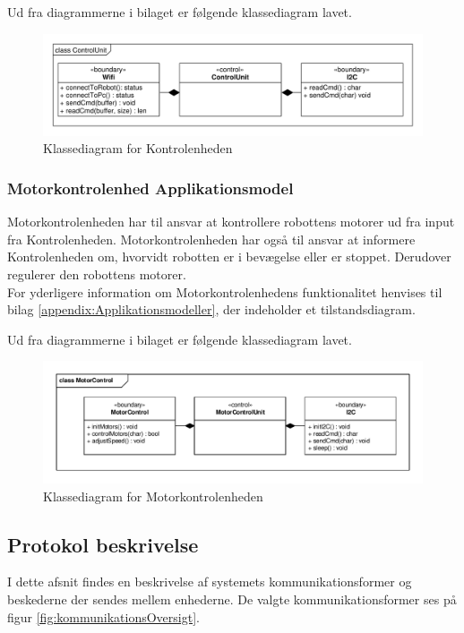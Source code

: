 Ud fra diagrammerne i bilaget er følgende klassediagram lavet.

\begin{figure}[H]
	\centering
	\includegraphics[width = \textwidth]{figur/classCUUdfyldt.pdf}
	\caption{Klassediagram for Kontrolenheden}
	\label{fig:klassediagramCU}
\end{figure}


\subsubsection{Motorkontrolenhed Applikationsmodel}
Motorkontrolenheden har til ansvar at kontrollere robottens motorer ud fra input fra Kontrolenheden. 
Motorkontrolenheden har også til ansvar at informere Kontrolenheden om, hvorvidt robotten er i bevægelse eller er stoppet. 
Derudover regulerer den robottens motorer. \\ 
For yderligere information om Motorkontrolenhedens funktionalitet henvises til bilag \ref{appendix:Applikationsmodeller}, der indeholder et tilstandsdiagram.

Ud fra diagrammerne i bilaget er følgende klassediagram lavet.

\begin{figure}[H]
	\centering
	\includegraphics[width = \textwidth]{figur/classMCVisioFil.pdf}
	\caption{Klassediagram for Motorkontrolenheden}
	\label{fig:klassediagramMC}
\end{figure}

\pagebreak
\subsection{Protokol beskrivelse}
I dette afsnit findes en beskrivelse af systemets kommunikationsformer og beskederne der sendes mellem enhederne. 
De valgte kommunikationsformer ses på figur \ref{fig:kommunikationsOversigt}.

